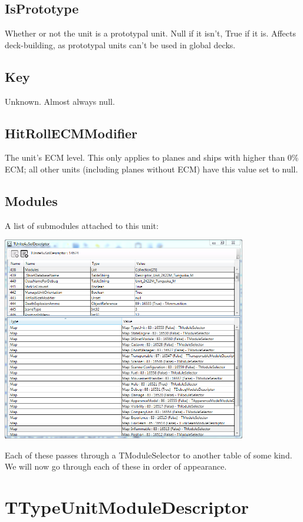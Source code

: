 \documentclass{article}
\begin{document}
\subsection{IsPrototype}

Whether or not the unit is a prototypal unit. Null if it isn't, True if it is. Affects deck-building, as prototypal units can't be used in global decks.

\subsection{Key}

Unknown. Almost always null.

\subsection{HitRollECMModifier}

The unit's ECM level. This only applies to planes and ships with higher than 0\% ECM; all other units (including planes without ECM) have this value set to null.

\subsection{Modules}

A list of submodules attached to this unit:


\includegraphics[width=0.8\textwidth]{screenshot_modules}

Each of these passes through a TModuleSelector to another table of some kind. We will now go through each of these in order of appearance.

\section{TTypeUnitModuleDescriptor}
\end{document}
